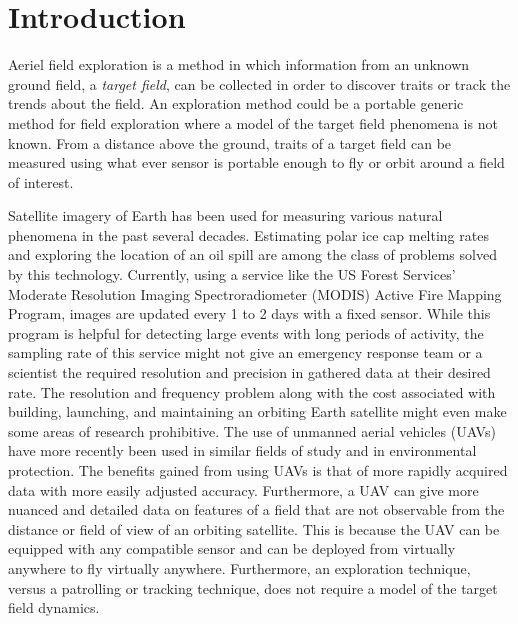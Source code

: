 
\chapter{Introduction}
Aeriel field exploration is a method in which information from an unknown ground field, a \textit{target field}, can be collected in order to discover traits or track the trends about the field. An exploration method could be a portable generic method for field exploration where a model of the target field phenomena is not known. From a distance above the ground, traits of a target field can be measured using what ever sensor is portable enough to fly or orbit around a field of interest.

Satellite imagery of Earth has been used for measuring various natural phenomena in the past several decades. Estimating polar ice cap melting rates and exploring the location of an oil spill are among the class of problems solved by this technology. Currently, using a service like the US Forest Services' Moderate Resolution Imaging Spectroradiometer (MODIS) Active Fire Mapping Program, images are updated every 1 to 2 days with a fixed sensor. While this program is helpful for detecting large events with long periods of activity, the sampling rate of this service might not give an emergency response team or a scientist the required resolution and precision in gathered data at their desired rate. The resolution and frequency problem along with the cost associated with building, launching, and maintaining an orbiting Earth satellite might even make some areas of research prohibitive. The use of unmanned aerial vehicles (UAVs) have more recently been used in similar fields of study and in environmental protection. The benefits gained from using UAVs is that of more rapidly acquired data with more easily adjusted accuracy. Furthermore, a UAV can give more nuanced and detailed data on features of a field that are not observable from the distance or field of view of an orbiting satellite. This is because the UAV can be equipped with any compatible sensor and can be deployed from virtually anywhere to fly virtually anywhere. Furthermore, an exploration technique, versus a patrolling or tracking technique, does not require a model of the target field dynamics.

